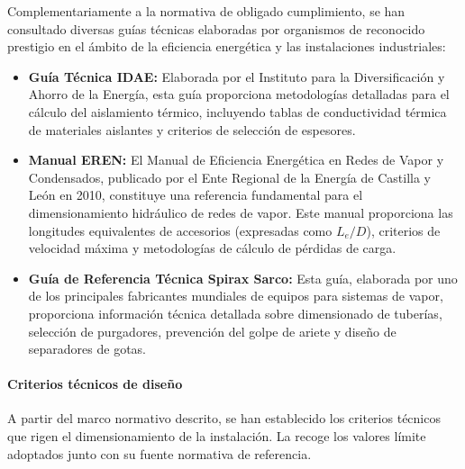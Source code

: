 Complementariamente a la normativa de obligado cumplimiento, se han consultado diversas guías técnicas elaboradas por organismos de reconocido prestigio en el ámbito de la eficiencia energética y las instalaciones industriales:

\begin{itemize}[leftmargin=2em]
	\item \textbf{Guía Técnica IDAE:} Elaborada por el Instituto para la Diversificación y Ahorro de la Energía, esta guía proporciona metodologías detalladas para el cálculo del aislamiento térmico, incluyendo tablas de conductividad térmica de materiales aislantes y criterios de selección de espesores.

	\item \textbf{Manual EREN:} El Manual de Eficiencia Energética en Redes de Vapor y Condensados, publicado por el Ente Regional de la Energía de Castilla y León en 2010, constituye una referencia fundamental para el dimensionamiento hidráulico de redes de vapor. Este manual proporciona las longitudes equivalentes de accesorios (expresadas como $L_e/D$), criterios de velocidad máxima y metodologías de cálculo de pérdidas de carga.

	\item \textbf{Guía de Referencia Técnica Spirax Sarco:} Esta guía, elaborada por uno de los principales fabricantes mundiales de equipos para sistemas de vapor, proporciona información técnica detallada sobre dimensionado de tuberías, selección de purgadores, prevención del golpe de ariete y diseño de separadores de gotas.
\end{itemize}

\paragraph{Criterios técnicos de diseño}

A partir del marco normativo descrito, se han establecido los criterios técnicos que rigen el dimensionamiento de la instalación. La  recoge los valores límite adoptados junto con su fuente normativa de referencia.

